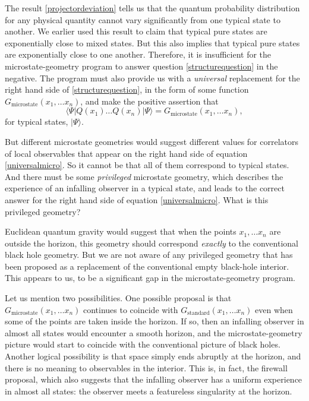 \documentclass[12pt]{article}
\def\qop{Q}
\newcommand{\be}{\begin{equation}}
\newcommand{\ee}{\end{equation}}
\begin{document}
The result \eqref{projectordeviation} tells us that the quantum probability distribution for any physical quantity cannot vary significantly from one typical state to another.  We earlier used this result to claim that typical pure states are exponentially close to mixed states. But this also implies that typical pure states are exponentially close to one another. Therefore, it is insufficient for the microstate-geometry program to answer question \eqref{structurequestion} in the negative. The program must also provide us with a {\em universal} replacement for the right hand side of \eqref{structurequestion}, in the form of some function $G_{\text{microstate}}(x_1, \ldots x_n)$, and make the positive assertion that
\be
\label{universalmicro}
\langle \Psi |  \qop(x_1) \ldots \qop(x_n) |\Psi \rangle = G_{\text{microstate}}(x_1, \ldots x_n),
\ee
for typical states, $|\Psi \rangle$.


But different microstate geometries would suggest different values for correlators of local observables that appear on the right hand side of equation \eqref{universalmicro}. So it cannot be that all of them correspond to typical states. And there must be some {\em privileged} microstate geometry, which describes the experience of an infalling observer in a typical state, and leads to the correct answer for the right hand side of equation \eqref{universalmicro}. What is this privileged geometry?


Euclidean quantum gravity would suggest that when the points $x_1, \ldots x_n$ are outside the horizon, this geometry should correspond {\em exactly} to the conventional black hole geometry. But we are not aware of any privileged geometry that has been proposed as a replacement of the conventional empty black-hole interior. This appears to us, to be a significant gap in the microstate-geometry program. 

Let us mention two possibilities. One possible proposal is that $G_{\text{microstate}}(x_1, \ldots x_n)$ continues to coincide with $G_{\text{standard}}(x_1, \ldots x_n)$ even when some of the points are taken inside the horizon. If so, then an infalling observer in almost all states would encounter a smooth horizon, and the microstate-geometry picture would start to coincide with the conventional picture of black holes.  Another logical possibility is that  space simply ends abruptly  at the horizon, and there is no meaning to observables in the interior. This is, in fact, the firewall proposal, which also suggests that the infalling observer has a uniform experience in almost all states: the observer meets a featureless singularity at the horizon.
\end{document}
